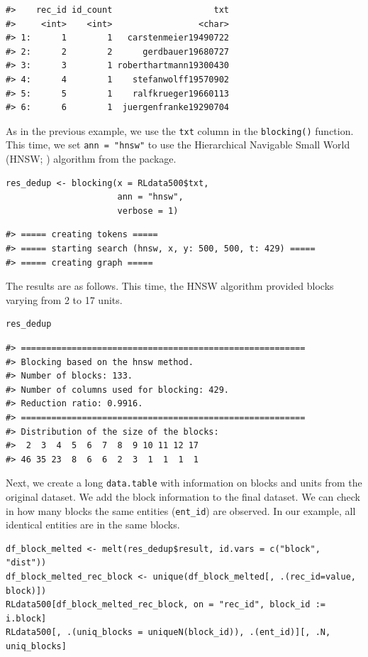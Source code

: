 \begin{verbatim}
#>    rec_id id_count                    txt
#>     <int>    <int>                 <char>
#> 1:      1        1   carstenmeier19490722
#> 2:      2        2      gerdbauer19680727
#> 3:      3        1 roberthartmann19300430
#> 4:      4        1    stefanwolff19570902
#> 5:      5        1    ralfkrueger19660113
#> 6:      6        1  juergenfranke19290704
\end{verbatim}

As in the previous example, we use the \texttt{txt} column in the \texttt{blocking()}
function. This time, we set \texttt{ann\ =\ "hnsw"} to use the Hierarchical
Navigable Small World (HNSW; \citet{malkov2018efficient}) algorithm from the
 package.

\begin{verbatim}
res_dedup <- blocking(x = RLdata500$txt,
                      ann = "hnsw",
                      verbose = 1)
\end{verbatim}

\begin{verbatim}
#> ===== creating tokens =====
#> ===== starting search (hnsw, x, y: 500, 500, t: 429) =====
#> ===== creating graph =====
\end{verbatim}

The results are as follows. This time, the HNSW algorithm provided
blocks varying from 2 to 17 units.

\begin{verbatim}
res_dedup
\end{verbatim}

\begin{verbatim}
#> ========================================================
#> Blocking based on the hnsw method.
#> Number of blocks: 133.
#> Number of columns used for blocking: 429.
#> Reduction ratio: 0.9916.
#> ========================================================
#> Distribution of the size of the blocks:
#>  2  3  4  5  6  7  8  9 10 11 12 17 
#> 46 35 23  8  6  6  2  3  1  1  1  1
\end{verbatim}

Next, we create a long \texttt{data.table} with information on blocks and units
from the original dataset. We add the block information to the final
dataset. We can check in how many blocks the same entities (\texttt{ent\_id})
are observed. In our example, all identical entities are in the same
blocks.

\begin{verbatim}
df_block_melted <- melt(res_dedup$result, id.vars = c("block", "dist"))
df_block_melted_rec_block <- unique(df_block_melted[, .(rec_id=value, block)])
RLdata500[df_block_melted_rec_block, on = "rec_id", block_id := i.block]
RLdata500[, .(uniq_blocks = uniqueN(block_id)), .(ent_id)][, .N, uniq_blocks]
\end{verbatim}

